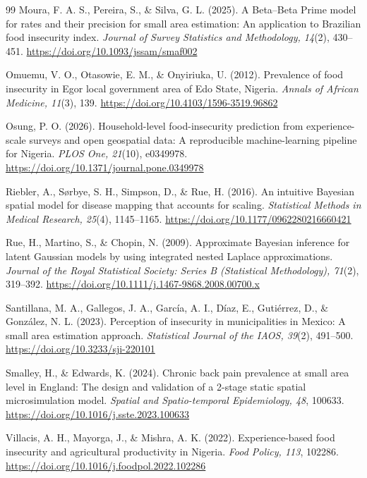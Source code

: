 \documentclass[12pt,a4paper]{article}
\theoremstyle{definition}
\theoremstyle{remark}
\begin{document}
\begin{sloppypar}
\begin{thebibliography}{99}
Moura, F. A. S., Pereira, S., \& Silva, G. L. (2025). A Beta--Beta Prime model for rates and their
precision for small area estimation: An application to Brazilian food insecurity index.
\emph{Journal of Survey Statistics and Methodology, 14}(2), 430--451.
\url{https://doi.org/10.1093/jssam/smaf002}

Omuemu, V. O., Otasowie, E. M., \& Onyiriuka, U. (2012). Prevalence of food insecurity in Egor local
government area of Edo State, Nigeria. \emph{Annals of African Medicine, 11}(3), 139.
\url{https://doi.org/10.4103/1596-3519.96862}

Osung, P. O. (2026). Household-level food-insecurity prediction from experience-scale surveys and
open geospatial data: A reproducible machine-learning pipeline for Nigeria. \emph{PLOS One, 21}(10),
e0349978. \url{https://doi.org/10.1371/journal.pone.0349978}

Riebler, A., Sørbye, S. H., Simpson, D., \& Rue, H. (2016). An intuitive Bayesian spatial model for
disease mapping that accounts for scaling. \emph{Statistical Methods in Medical Research, 25}(4),
1145--1165. \url{https://doi.org/10.1177/0962280216660421}

Rue, H., Martino, S., \& Chopin, N. (2009). Approximate Bayesian inference for latent Gaussian models
by using integrated nested Laplace approximations. \emph{Journal of the Royal Statistical Society:
Series B (Statistical Methodology), 71}(2), 319--392.
\url{https://doi.org/10.1111/j.1467-9868.2008.00700.x}

Santillana, M. A., Gallegos, J. A., García, A. I., Díaz, E., Gutiérrez, D., \& González, N. L.
(2023). Perception of insecurity in municipalities in Mexico: A small area estimation approach.
\emph{Statistical Journal of the IAOS, 39}(2), 491--500. \url{https://doi.org/10.3233/sji-220101}

Smalley, H., \& Edwards, K. (2024). Chronic back pain prevalence at small area level in England: The
design and validation of a 2-stage static spatial microsimulation model. \emph{Spatial and
Spatio-temporal Epidemiology, 48}, 100633. \url{https://doi.org/10.1016/j.sste.2023.100633}

Villacis, A. H., Mayorga, J., \& Mishra, A. K. (2022). Experience-based food insecurity and
agricultural productivity in Nigeria. \emph{Food Policy, 113}, 102286.
\url{https://doi.org/10.1016/j.foodpol.2022.102286}


\end{thebibliography}
\end{sloppypar}
\end{document}
